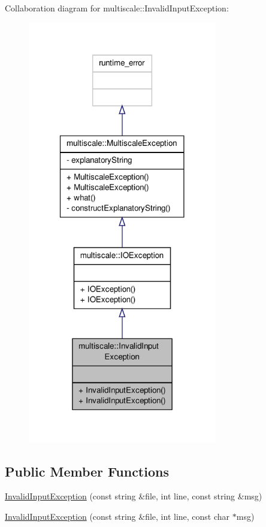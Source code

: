 Collaboration diagram for multiscale\-:\-:Invalid\-Input\-Exception\-:
\nopagebreak
\begin{figure}[H]
\begin{center}
\leavevmode
\includegraphics[width=234pt]{classmultiscale_1_1InvalidInputException__coll__graph}
\end{center}
\end{figure}
\subsection*{Public Member Functions}
\begin{DoxyCompactItemize}
\item 
\hyperlink{classmultiscale_1_1InvalidInputException_aea7260856bd45bd4443d7626de243b72}{Invalid\-Input\-Exception} (const string \&file, int line, const string \&msg)
\item 
\hyperlink{classmultiscale_1_1InvalidInputException_af12fa935cdc2aacbba5ea8cda0ef8df1}{Invalid\-Input\-Exception} (const string \&file, int line, const char $\ast$msg)
\end{DoxyCompactItemize}


